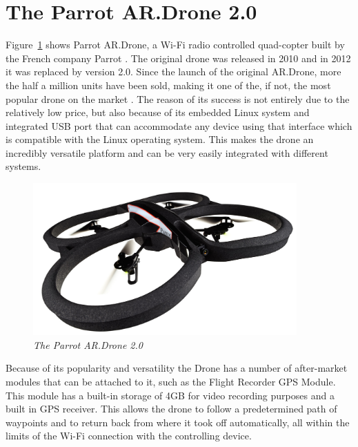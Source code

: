 \section{The Parrot AR.Drone 2.0}

Figure~\ref{fig:drone} shows Parrot AR.Drone, a Wi-Fi radio controlled quad-copter built by the French company Parrot\cite{parrot2012drone} .
The original drone was released in 2010 and in 2012 it was replaced by version 2.0. Since the launch of the original AR.Drone, more the half a million units have been sold, making it one of the, if not, the most popular drone on the market \cite{parrotpopular}. The reason of its success is not entirely due to the relatively low price, but also because of its embedded Linux system and integrated USB port that can accommodate any device using that interface which is compatible with the Linux operating system. This makes the drone an incredibly versatile platform and can be very easily integrated with different systems. 
\begin{figure}[ht]
\begin{center}
\includegraphics[width=0.9\textwidth]{img/drone.jpg}
\end{center}
\caption{\small \itshape{The Parrot AR.Drone 2.0}}
  \label{fig:drone}
\end{figure}


Because of its popularity and versatility the Drone has a number of after-market modules that can be attached to it, such as 
the Flight Recorder GPS Module. This module has a built-in storage of 4GB for video recording purposes and a built in GPS receiver. This allows the drone to follow a predetermined path of waypoints and to return back from where it took off automatically, all within the limits of the Wi-Fi connection with the controlling device.

